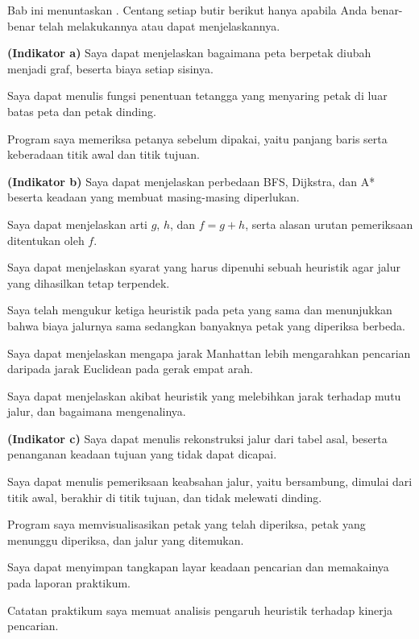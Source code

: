 
Bab ini menuntaskan . Centang setiap butir berikut hanya apabila
Anda benar-benar telah melakukannya atau dapat menjelaskannya.

\begin{checklistbox}
\begin{checklist}
  \item {\bfseries (Indikator a)} Saya dapat menjelaskan bagaimana peta
        berpetak diubah menjadi graf, beserta biaya setiap sisinya.
  \item Saya dapat menulis fungsi penentuan tetangga yang menyaring petak di
        luar batas peta dan petak dinding.
  \item Program saya memeriksa petanya sebelum dipakai, yaitu panjang baris
        serta keberadaan titik awal dan titik tujuan.
  \item {\bfseries (Indikator b)} Saya dapat menjelaskan perbedaan BFS,
        Dijkstra, dan A* beserta keadaan yang membuat masing-masing diperlukan.
  \item Saya dapat menjelaskan arti $g$, $h$, dan $f = g + h$, serta alasan
        urutan pemeriksaan ditentukan oleh $f$.
  \item Saya dapat menjelaskan syarat yang harus dipenuhi sebuah heuristik agar
        jalur yang dihasilkan tetap terpendek.
  \item Saya telah mengukur ketiga heuristik pada peta yang sama dan
        menunjukkan bahwa biaya jalurnya sama sedangkan banyaknya petak yang
        diperiksa berbeda.
  \item Saya dapat menjelaskan mengapa jarak Manhattan lebih mengarahkan
        pencarian daripada jarak Euclidean pada gerak empat arah.
  \item Saya dapat menjelaskan akibat heuristik yang melebihkan jarak terhadap
        mutu jalur, dan bagaimana mengenalinya.
  \item {\bfseries (Indikator c)} Saya dapat menulis rekonstruksi jalur dari
        tabel asal, beserta penanganan keadaan tujuan yang tidak dapat dicapai.
  \item Saya dapat menulis pemeriksaan keabsahan jalur, yaitu bersambung,
        dimulai dari titik awal, berakhir di titik tujuan, dan tidak melewati
        dinding.
  \item Program saya memvisualisasikan petak yang telah diperiksa, petak yang
        menunggu diperiksa, dan jalur yang ditemukan.
  \item Saya dapat menyimpan tangkapan layar keadaan pencarian dan
        memakainya pada laporan praktikum.
  \item Catatan praktikum saya memuat analisis pengaruh heuristik terhadap
        kinerja pencarian.
\end{checklist}
\end{checklistbox}
